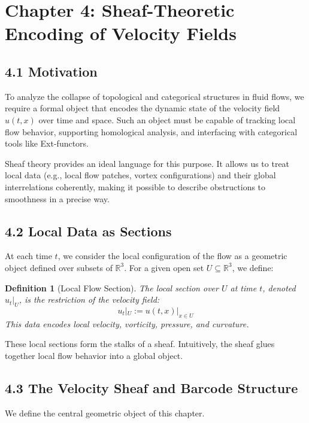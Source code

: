 \documentclass[11pt]{article}
\newtheorem{definition}[theorem]{Definition}
\begin{document}
\section{Chapter 4: Sheaf-Theoretic Encoding of Velocity Fields}

\subsection{4.1 Motivation}

To analyze the collapse of topological and categorical structures in fluid flows,  
we require a formal object that encodes the dynamic state of the velocity field \( u(t,x) \) over time and space.  
Such an object must be capable of tracking local flow behavior, supporting homological analysis,  
and interfacing with categorical tools like Ext-functors.

Sheaf theory provides an ideal language for this purpose.  
It allows us to treat local data (e.g., local flow patches, vortex configurations) and their global interrelations coherently,  
making it possible to describe obstructions to smoothness in a precise way.

\subsection{4.2 Local Data as Sections}

At each time \( t \), we consider the local configuration of the flow as a geometric object defined over subsets of \( \mathbb{R}^3 \).  
For a given open set \( U \subseteq \mathbb{R}^3 \), we define:

\begin{definition}[Local Flow Section]
The local section over \( U \) at time \( t \), denoted \( u_t|_U \), is the restriction of the velocity field:
\[
u_t|_U := u(t,x)|_{x \in U}
\]
This data encodes local velocity, vorticity, pressure, and curvature.
\end{definition}

These local sections form the stalks of a sheaf. Intuitively, the sheaf glues together local flow behavior into a global object.

\subsection{4.3 The Velocity Sheaf and Barcode Structure}

We define the central geometric object of this chapter.
\end{document}
